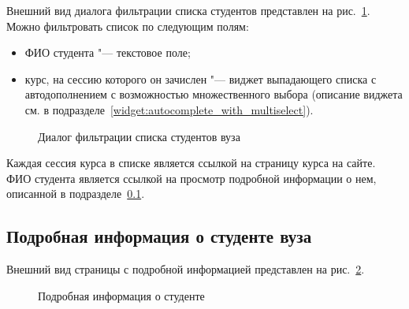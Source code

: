 Внешний вид диалога фильтрации списка студентов представлен на рис.~\ref{img:student:univ_student_list_filter}.
Можно фильтровать список по следующим полям:
\begin{itemize}
	\item ФИО студента "--- текстовое поле;
	\item курс, на сессию которого он зачислен "--- виджет выпадающего списка с автодополнением 
	с возможностью множественного выбора (описание виджета см. в подразделе~\ref{widget:autocomplete_with_multiselect}).
\end{itemize}

 
\begin{figure}[H]
	\caption{Диалог фильтрации списка студентов вуза}
	\label{img:student:univ_student_list_filter}
\end{figure}

Каждая сессия курса в списке является ссылкой на страницу курса на сайте. 
ФИО студента является ссылкой на просмотр подробной информации о нем, 
описанной в подразделе~\ref{sec:student_detail}.

\subsection{Подробная информация о студенте вуза} \label{sec:student_detail}
Внешний вид страницы с подробной информацией представлен на рис.~\ref{img:student:student_detail}.

\begin{figure}[H]
	\caption{Подробная информация о студенте}
	\label{img:student:student_detail}
\end{figure}

